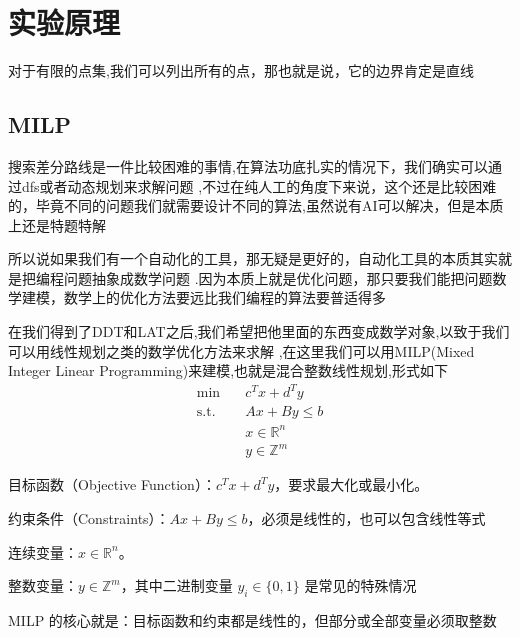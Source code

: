 \section{实验原理}




对于有限的点集,我们可以列出所有的点，那也就是说，它的边界肯定是直线
\subsection{MILP}

搜索差分路线是一件比较困难的事情,在算法功底扎实的情况下，我们确实可以通过dfs或者动态规划来求解问题
,不过在纯人工的角度下来说，这个还是比较困难的，毕竟不同的问题我们就需要设计不同的算法,虽然说有AI可以解决，但是本质上还是特题特解

所以说如果我们有一个自动化的工具，那无疑是更好的，自动化工具的本质其实就是把编程问题抽象成数学问题
.因为本质上就是优化问题，那只要我们能把问题数学建模，数学上的优化方法要远比我们编程的算法要普适得多

在我们得到了DDT和LAT之后,我们希望把他里面的东西变成数学对象,以致于我们可以用线性规划之类的数学优化方法来求解
,在这里我们可以用MILP(Mixed Integer Linear Programming)来建模,也就是混合整数线性规划,形式如下
\[
\begin{aligned}
\min \quad & c^T x+d^T y\\
\text{s.t.}\quad & Ax+By\leq b\\
& x\in\mathbb R^n\\
& y\in\mathbb Z^m
\end{aligned}
\]

目标函数（Objective Function）：\(c^Tx+d^Ty\)，要求最大化或最小化。

约束条件（Constraints）：\(Ax+By\leq b\)，必须是线性的，也可以包含线性等式

连续变量：\(x\in\mathbb R^n\)。

整数变量：\(y\in\mathbb Z^m\)，其中二进制变量 \(y_i\in\{0,1\}\) 是常见的特殊情况

MILP 的核心就是：目标函数和约束都是线性的，但部分或全部变量必须取整数

